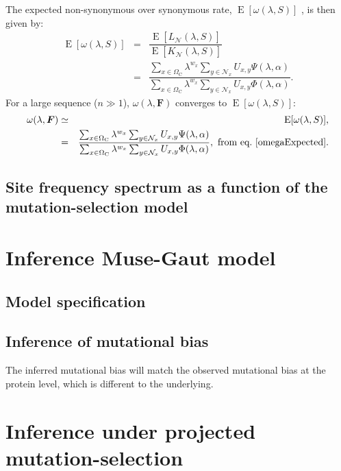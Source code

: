 \documentclass{article}
\newcommand{\SetCodon}{\Omega_{\mathrm{C}}}
\newcommand{\NonSyn}{\mathcal{N}}
\newcommand{\NxNonSyn}{\NonSyn_x}
\begin{document}
	The expected non-synonymous over synonymous rate, $\operatorname{E} [\omega(\lambda, S)]$ , is then given by:
	\begin{eqnarray}
		\operatorname{E} [\omega(\lambda, S)]
		& = &   \dfrac{\operatorname{E} [L_{\NonSyn}(\lambda, S)]}{\operatorname{E} [K_{\NonSyn}(\lambda, S)]} \\
		& = & \dfrac{\sum_{x \in \SetCodon} \lambda^{w_x} \sum_{y \in \NxNonSyn} U_{x, y} \Psi(\lambda, \alpha)}{\sum_{x \in \SetCodon} \lambda^{w_x} \sum_{y \in \NxNonSyn} U_{x, y} \Phi(\lambda, \alpha)}.
		\label{omegaExpected}
	\end{eqnarray}
	 For a large sequence ($ n \gg 1 $), $\omega (\lambda, \bm{F})$ converges to $\operatorname{E} [\omega(\lambda, S)]$:
	\begin{eqnarray}
		\omega (\lambda, \bm{F})
		& \simeq & \operatorname{E} [\omega(\lambda, S)],\\
		& = & \dfrac{\sum_{x \in \SetCodon} \lambda^{w_x} \sum_{y \in \NxNonSyn} U_{x, y} \Psi(\lambda, \alpha)}{\sum_{x \in \SetCodon} \lambda^{w_x} \sum_{y \in \NxNonSyn} U_{x, y} \Phi(\lambda, \alpha)}, \ \textrm{from eq.} \ \ref{omegaExpected}.
	\end{eqnarray}
   	\subsection{Site frequency spectrum as a function of the mutation-selection model}
    	
    \section{Inference Muse-Gaut model}

    \subsection{Model specification}

    \subsection{Inference of mutational bias}
    The inferred mutational bias will match the observed mutational bias at the protein level, which is different to the underlying.

    \section{Inference under projected mutation-selection}
\end{document}
